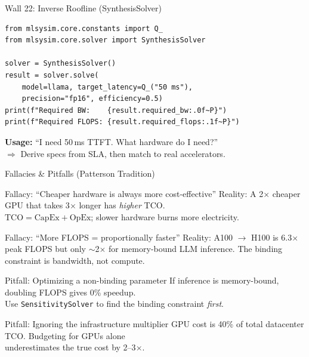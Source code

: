 \documentclass[aspectratio=169, 12pt]{beamer}
\begin{document}
\begin{frame}[fragile]{Wall 22: Inverse Roofline (SynthesisSolver)}
\begin{lstlisting}
from mlsysim.core.constants import Q_
from mlsysim.core.solver import SynthesisSolver

solver = SynthesisSolver()
result = solver.solve(
    model=llama, target_latency=Q_("50 ms"),
    precision="fp16", efficiency=0.5)
print(f"Required BW:    {result.required_bw:.0f~P}")
print(f"Required FLOPS: {result.required_flops:.1f~P}")
\end{lstlisting}

\vspace{0.5em}
\textbf{Usage:} ``I need 50\,ms TTFT. What hardware do I need?''\\
$\Rightarrow$ Derive specs from SLA, then match to real accelerators.
\end{frame}

\begin{frame}{Fallacies \& Pitfalls (Patterson Tradition)}
\begin{block}{Fallacy: ``Cheaper hardware is always more cost-effective''}
Reality: A 2$\times$ cheaper GPU that takes 3$\times$ longer has \emph{higher} TCO.\\
$\text{TCO} = \text{CapEx} + \text{OpEx}$; slower hardware burns more electricity.
\end{block}

\begin{block}{Fallacy: ``More FLOPS = proportionally faster''}
Reality: A100 $\to$ H100 is 6.3$\times$ peak FLOPS but only $\sim$2$\times$ for
memory-bound LLM inference. The binding constraint is bandwidth, not compute.
\end{block}

\begin{block}{Pitfall: Optimizing a non-binding parameter}
If inference is memory-bound, doubling FLOPS gives 0\% speedup.\\
Use \texttt{SensitivitySolver} to find the binding constraint \emph{first}.
\end{block}

\begin{block}{Pitfall: Ignoring the infrastructure multiplier}
GPU cost is 40\% of total datacenter TCO. Budgeting for GPUs alone\\
underestimates the true cost by 2--3$\times$.
\end{block}
\end{frame}
\end{document}
